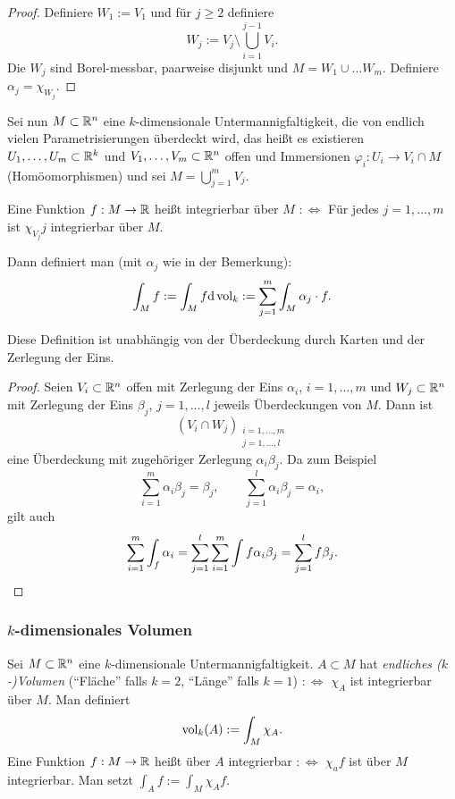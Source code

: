 \begin{proof}
 Definiere $W_1 := V_1$ und für $j \ge 2$ definiere 
 \[ W_j := V_j \setminus \bigcup_{i=1}^{j-1} V_i. \]
 Die $W_j$ sind Borel-messbar, paarweise disjunkt und $M = W_1 \cup \ldots W_m$. Definiere $\alpha_j = \chi_{W_j}$.
\end{proof}

Sei nun $M \subset \mathbb{R}^n$ eine $k$-dimensionale Untermannigfaltigkeit, die von endlich vielen Parametrisierungen überdeckt wird, das heißt es existieren $U_1, \ldots, U_m \subset \mathbb{R}^k$ und $V_1, \ldots, V_m \subset \mathbb{R}^n$ offen und Immersionen $\varphi_i : U_i \to V_i \cap M$ (Homöomorphismen) und sei $M = \bigcup_{j=1}^m V_j$.

Eine Funktion $f : M \to \mathbb{R}$ heißt integrierbar über $M$ $:\Leftrightarrow$ Für jedes $j = 1, \ldots, m$ ist $\chi_{V_j} j$ integrierbar über $M$. 

Dann definiert man (mit $\alpha_j$ wie in der Bemerkung):
\[ \int_M f := \int_M f \mathrm{d} \operatorname{vol}_k := \sum_{j=1}^m \int_M \alpha_j \cdot f. \]

\begin{rmrk}
 Diese Definition ist unabhängig von der Überdeckung durch Karten und der Zerlegung der Eins.
\end{rmrk}

\begin{proof}
Seien $V_i \subset \mathbb{R}^n$ offen mit Zerlegung der Eins $\alpha_i$, $i = 1, \ldots, m$ und $W_j \subset \mathbb{R}^n$ mit Zerlegung der Eins $\beta_j$, $j = 1, \ldots, l$ jeweils Überdeckungen von $M$. Dann ist 
\[ (V_i \cap W_j)_{\substack{i = 1,\ldots,m \\ j=1,\ldots,l}} \]
eine Überdeckung mit zugehöriger Zerlegung $\alpha_i \beta_j$. Da zum Beispiel
\[ \sum_{i = 1}^m \alpha_i \beta_j = \beta_j, \qquad \sum_{j=1}^l \alpha_i \beta_j = \alpha_i, \]
gilt auch
\[ \sum_{i=1}^m \int_f \alpha_i = \sum_{j=1}^l \sum_{i=1}^m \int f \alpha_i \beta_j = \sum_{j=1}^l f \beta_j. \qedhere \]
\end{proof}

\subsubsection{\texorpdfstring{$k$}{k}-dimensionales Volumen}
Sei $M \subset \mathbb{R}^n$ eine $k$-dimensionale Untermannigfaltigkeit. $A \subset M$ hat \emph{endliches ($k$-)Volumen} (``Fläche'' falls $k=2$, ``Länge'' falls $k=1$) $:\Leftrightarrow$ $\chi_A$ ist integrierbar über $M$. Man definiert
\[ \operatorname{vol}_k (A) := \int_M \chi_A. \]
Eine Funktion $f : M \to \mathbb{R}$ heißt über $A$ integrierbar $:\Leftrightarrow$ $\chi_a f$ ist über $M$ integrierbar. Man setzt $\int_A f := \int_M \chi_A f$.

